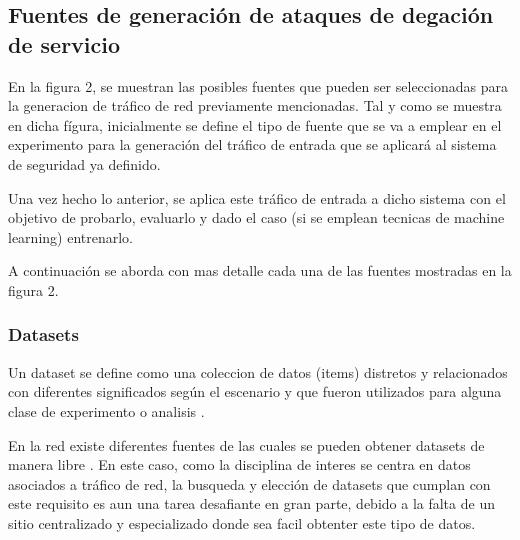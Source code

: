 \documentclass[12pt]{article}
\begin{document}
\subsection{Fuentes de generación de ataques de degación de servicio}

En la figura 2, se muestran las posibles fuentes que pueden ser seleccionadas para la generacion de tráfico de red previamente mencionadas. Tal y como se muestra en dicha fígura, inicialmente se define el tipo de fuente que se va a emplear en el experimento para la generación del tráfico de entrada que se aplicará al sistema de seguridad ya definido.

Una vez hecho lo anterior, se aplica este tráfico de entrada a dicho sistema con el objetivo de probarlo, evaluarlo y dado el caso (si se emplean tecnicas de machine learning) entrenarlo. 

A continuación se aborda con mas detalle cada una de las fuentes mostradas en la figura 2.

\subsubsection{Datasets} 

Un dataset se define como una coleccion de datos (items) distretos y relacionados con diferentes significados según el escenario y que fueron utilizados para alguna clase de experimento o analisis \citep{datasets_availability}. 

En la red existe diferentes fuentes de las cuales se pueden obtener datasets de manera libre \citep{UCI, kaggle, awesome_public_datasets}. En este caso, como la disciplina de interes se centra en datos asociados a tráfico de red, la busqueda y elección de datasets que cumplan con este requisito es aun una tarea desafiante en gran parte, debido a la falta de un sitio centralizado y especializado donde sea facil obtenter este tipo de datos. 
\end{document}
